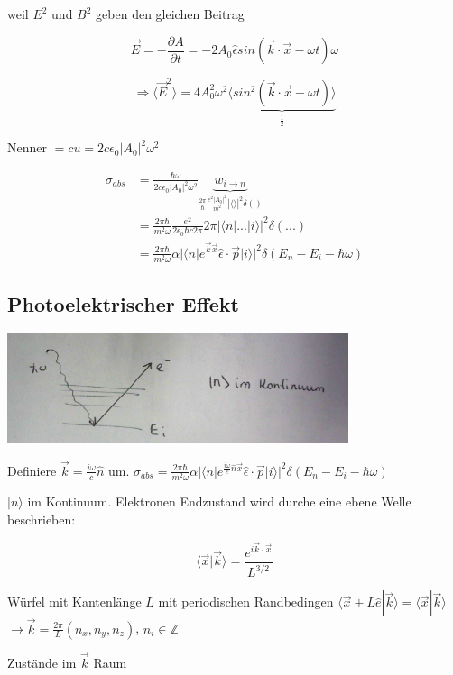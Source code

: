 weil \(E^2\) und \(B^2\) geben den gleichen Beitrag

\[ \vec E = -\frac{\partial A}{\partial t} = -2A_0\hat \epsilon sin(\vec k\cdot\vec x -\omega t)\omega\]

\[\Rightarrow \langle \vec E^2\rangle = 4A_0^2\omega^2 \underbrace{\langle sin^2(\vec k\cdot\vec x -\omega t)\rangle }_{\frac{1}{2}}\]

Nenner \(=cu=2c\epsilon_0|A_0|^2\omega^2\)

\begin{align}
  \sigma_{abs} &= \frac{\hbar \omega}{2c\epsilon_0|A_0|^2\omega^2}\underbrace{ w_{i\rightarrow n}}_{\frac{2\pi}{\hbar}\frac{e^2|A_0|^2}{m^2}|\langle \rangle |^2\delta()}\\
  &= \frac{2\pi\hbar}{m^2\omega}\frac{e^2}{2\epsilon_0\hbar c 2\pi}2\pi |\langle n|...|i\rangle|^2\delta(...)\\
  &=\frac{2\pi\hbar}{m^2\omega}\alpha |\langle n|e^{\vec k\vec x}\hat \epsilon\cdot\vec p|i\rangle|^2\delta(E_n-E_i-\hbar\omega)
\end{align}


\subsection{Photoelektrischer Effekt}

\includegraphics[width=0.75\textwidth]{kap03_10.png}


Definiere \(\vec k=\frac{i\omega}{c}\hat n\) um. \(\sigma_{abs}=\frac{2\pi\hbar}{m^2\omega}\alpha |\langle n|e^{\frac{i\omega}{c}\hat n\vec x}\hat \epsilon\cdot\vec p|i\rangle|^2\delta(E_n-E_i-\hbar\omega)\)

\(|n\rangle\) im Kontinuum. Elektronen Endzustand wird durche eine ebene Welle beschrieben:

\[ \langle \vec x|\vec k\rangle = \frac{e^{i\vec k\cdot\vec x}}{L^{3/2}}\]

Würfel mit Kantenlänge \(L\) mit periodischen Randbedingen \(\langle \vec x + L\hat e|\vec k\rangle =\langle \vec x|\vec k\rangle \) \(\rightarrow \vec k = \frac{2\pi}{L}(n_x,n_y,n_z)\), \(n_i\in \mathbb Z\)

Zustände im \(\vec k\) Raum




